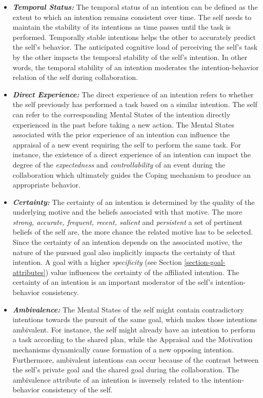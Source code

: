 \documentclass[12pt]{report}
\begin{document}
\begin{itemize}
  \item \textbf{\textit{Temporal Status:}} The temporal status of an intention
  can be defined as the extent to which an intention remains consistent over
  time. The self needs to maintain the stability of its intentions as time
  passes until the task is performed. Temporally stable intentions helps the
  other to accurately predict the self's behavior. The anticipated cognitive
  load of perceiving the self's task by the other impacts the temporal stability
  of the self's intention. In other words, the temporal stability of an
  intention moderates the intention-behavior relation of the self during
  collaboration.
  
  \item \textbf{\textit{Direct Experience:}} The direct experience of an
  intention refers to whether the self previously has performed a task based on
  a similar intention. The self can refer to the corresponding Mental States
  of the intention directly experienced in the past before taking a new action.
  The Mental States associated with the prior experience of an intention can
  influence the appraisal of a new event requiring the self to perform the same
  task. For instance, the existence of a direct experience of an intention
  can impact the degree of the \textit{expectedness} and
  \textit{controllability} of an event during the collaboration which ultimately
  guides the Coping mechanism to produce an appropriate behavior.
  
  \item \textbf{\textit{Certainty:}} The certainty of an intention is determined
  by the quality of the underlying motive and the beliefs associated with that
  motive. The more \textit{strong, accurate, frequent, recent, salient} and
  \textit{persistent} a set of pertinent beliefs of the self are, the more
  chance the related motive has to be selected. Since the certainty of an
  intention depends on the associated motive, the nature of the pursued goal also
  implicitly impacts the certainty of that intention. A goal with a higher
  \textit{specificity} (see Section \ref{section-goal-attributes}) value
  influences the certainty of the affiliated intention. The certainty of an
  intention is an important moderator of the self's intention-behavior
  consistency.
  
  \item \textbf{\textit{Ambivalence:}} The Mental States of the self might
  contain contradictory intentions towards the pursuit of the same goal, which
  makes those intentions ambivalent. For instance, the self might already have
  an intention to perform a task according to the shared plan, while the Appraisal
  and the Motivation mechanisms dynamically cause formation of a new opposing
  intention. Furthermore, ambivalent intentions can occur because of the
  contrast between the self's private goal and the shared goal during the
  collaboration. The ambivalence attribute of an intention is inversely related
  to the intention-behavior consistency of the self.
  

\end{itemize}
\end{document}
